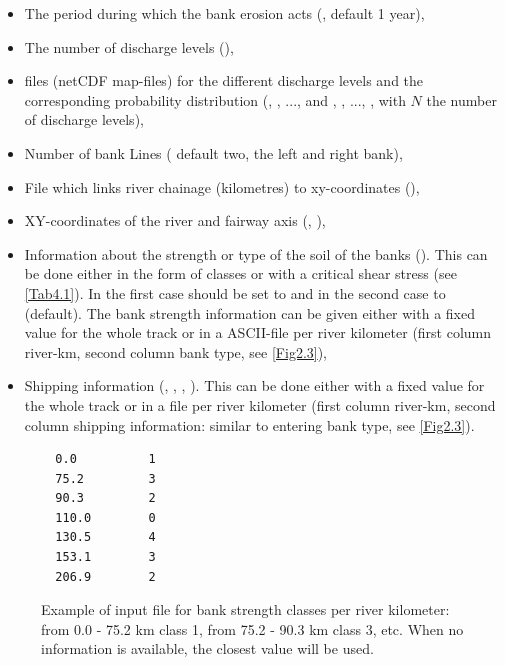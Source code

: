 \begin{itemize}
\item The period during which the bank erosion acts (, default 1 year),
\item The number of discharge levels (),
\item \dflowfm files (netCDF map-files) for the different discharge levels and the corresponding probability distribution (, , ...,  and , , ..., , with $N$ the number of discharge levels),
\item Number of bank Lines ( default two, the left and right bank),
\item File which links river chainage (kilometres) to xy-coordinates (),
\item XY-coordinates of the river and fairway axis (, ),
\item Information about the strength or type of the soil of the banks ().
This can be done either in the form of classes or with a critical shear stress (see \autoref{Tab4.1}).
In the first case  should be set to  and in the second case to  (default).
The bank strength information can be given either with a fixed value for the whole track or in a ASCII-file per river kilometer (first column river-km, second column bank type, see \autoref{Fig2.3}),
\item Shipping information (, , , ).
This can be done either with a fixed value for the whole track or in a file per river kilometer (first column river-km, second column shipping information: similar to entering bank type, see \autoref{Fig2.3}).
\end{itemize}

\begin{figure}
\begin{Verbatim}
  0.0          1
  75.2         3
  90.3         2
  110.0        0
  130.5        4
  153.1        3
  206.9        2
\end{Verbatim}
\caption{Example of input file for bank strength classes per river kilometer: from 0.0 - 75.2 km class 1, from 75.2 - 90.3 km class 3, etc.
When no information is available, the closest value will be used.}
\label{Fig2.3}
\end{figure}

